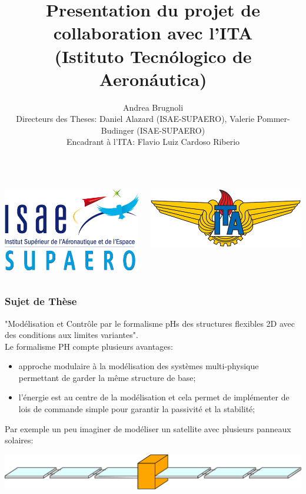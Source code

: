 \documentclass{beamer}
\title[Collaboration avec l'ITA]{Presentation du projet de collaboration avec l'ITA \\ (Istituto Tecn\'ologico de Aeron\'autica)}
\author[A. Brugnoli ISAE-SUPAERO]{\small Andrea Brugnoli \\
 \footnotesize Directeurs des Theses: Daniel Alazard (ISAE-SUPAERO), Valerie Pommer-Budinger (ISAE-SUPAERO) \\
\footnotesize Encadrant à l'ITA: Flavio Luiz Cardoso Riberio}
\begin{document}
	
	
	
\begin{frame}
\titlepage
\begin{columns}
	\begin{column}{0.5\textwidth}
		\centering
		\includegraphics[height=0.2\textheight]{ISAE-SUPAERO.png}
	\end{column}
	\begin{column}{0.5\textwidth}
		\centering
		\includegraphics[scale=0.3]{ITA_logo.png}
	\end{column}
\end{columns}

\end{frame}

\begin{frame}
\frametitle{Sujet de Thèse}
"Modélisation et Contrôle par le formalisme pHs des structures flexibles 2D avec des conditions aux limites variantes".\\
\vspace{5mm}
Le formalisme PH compte plusieurs avantages:
\begin{itemize}
\item approche modulaire à la modélisation des systèmes multi-physique permettant de garder la même structure de base;
\item l'énergie est au centre de la modélisation et cela permet de implémenter de lois de commande simple pour garantir la passivité et la stabilité;

\end{itemize}
Par exemple un peu imaginer de modéliser un satellite avec plusieurs panneaux solaires:

\includegraphics[width=0.99 \columnwidth]{multiarray.eps}
\end{frame}
\end{document}
